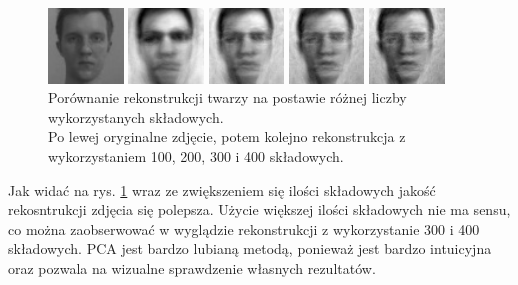 \documentclass{article}
\begin{document}
\begin{figure}
\centering
	\parbox{2cm}{
		\includegraphics[width=2cm]{face_1.jpg}
		}
		\qquad
		\begin{minipage}{2cm}
			\includegraphics[width=2cm]{100.jpg}
		\end{minipage}
		\begin{minipage}{2cm}
			\includegraphics[width=2cm]{200.jpg}
		\end{minipage}
		\begin{minipage}{2cm}
			\includegraphics[width=2cm]{300.jpg}
		\end{minipage}
		\begin{minipage}{2cm}
			\includegraphics[width=2cm]{400.jpg}
		\end{minipage}
	\caption{Porównanie rekonstrukcji twarzy na postawie różnej liczby wykorzystanych składowych.\\ Po lewej oryginalne zdjęcie, potem kolejno rekonstrukcja z wykorzystaniem 100, 200, 300 i 400 składowych.}
	\label{fig:rekonstrukcja}
\end{figure}

Jak widać na rys. \ref{fig:rekonstrukcja} wraz ze zwiększeniem się ilości składowych jakość rekosntrukcji zdjęcia się polepsza. Użycie większej ilości składowych nie ma sensu, co można zaobserwować w wyglądzie rekonstrukcji z wykorzystanie 300 i 400 składowych. PCA jest bardzo lubianą metodą, ponieważ jest bardzo intuicyjna oraz pozwala na wizualne sprawdzenie własnych rezultatów.
\end{document}
